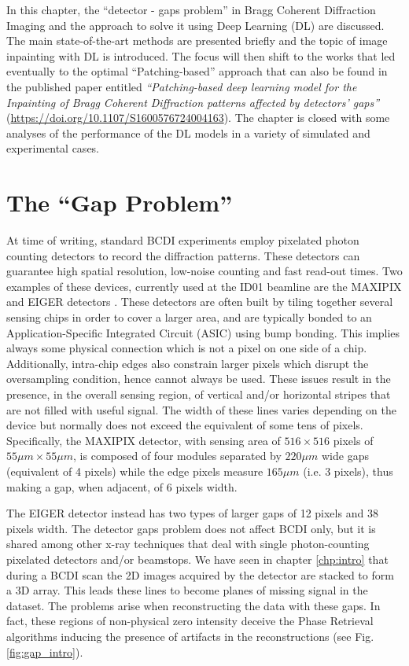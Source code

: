 
In this chapter, the ``detector - gaps problem'' in Bragg Coherent Diffraction Imaging and the approach to solve it
using Deep Learning (DL) are discussed. The main state-of-the-art methods are presented briefly and
the topic of image inpainting with DL is introduced. The focus will then shift to the works that led
eventually to the optimal ``Patching-based'' approach that can also be found in the published paper entitled
 \textit{``Patching-based deep learning model for the Inpainting of Bragg Coherent Diffraction patterns affected 
 by detectors' gaps''} (\url{https://doi.org/10.1107/S1600576724004163}). The chapter is closed with some analyses 
 of the performance of the DL models in a variety of simulated and experimental cases.  

\section{The ``Gap Problem''}\label{sec:gaps}

At time of writing, standard BCDI experiments employ pixelated photon counting detectors to record the diffraction
patterns. These detectors can guarantee high spatial resolution, low-noise counting and fast read-out times. Two examples 
of these devices, currently used at the ID01 beamline are the MAXIPIX and EIGER detectors \cite{ponchut_maxipix_2011, Eiger_Johnson_2014}.
These detectors are often built by tiling together several sensing chips in order to cover a larger area, and are
typically bonded to an Application-Specific Integrated Circuit (ASIC) using bump bonding. This implies always some 
physical connection which is not a pixel on one side of a chip. Additionally, intra-chip edges also constrain larger 
pixels which disrupt the oversampling condition, hence cannot always be used.
These issues result in the presence, in the overall sensing region, of vertical and/or horizontal stripes that are not 
filled with useful signal. The width of these lines varies depending on the device but normally does not exceed the equivalent 
of some tens of pixels. Specifically, the MAXIPIX detector, with sensing area of $516\times516$ pixels of 
$55\mu m\times55\mu m$, is composed of four modules separated by $220\mu m$ wide gaps (equivalent of 4 pixels) while the 
edge pixels measure $165\mu m$ (i.e. 3 pixels), thus making a gap, when adjacent, of 6 pixels width.

The EIGER detector instead has two types of larger gaps of 12 pixels and 38 pixels width.
The detector gaps problem does not affect BCDI only, but it is shared among other x-ray techniques that deal with single photon-counting
pixelated detectors and/or beamstops.
We have seen in chapter \ref{chp:intro} that during a BCDI scan the 2D images acquired by the detector are stacked to form
a 3D array. This leads these lines to become planes of missing signal in the dataset.
The problems arise when reconstructing the data with these gaps. In fact, these regions of non-physical zero intensity
deceive the Phase Retrieval algorithms inducing the presence of artifacts in the reconstructions \cite{carnis_towards_2019} (see Fig.\ref{fig:gap_intro}).

